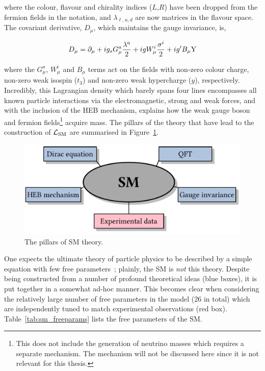\noindent
where the colour, flavour and chirality indices ($L$,$R$) have been dropped from the fermion fields in the notation, and $\lambda_{\ell,u,d}$ are now matrices in the flavour space. The covariant derivative, $D_\mu$, which maintains the gauge invariance, is,

\begin{equation}
    D_\mu = \partial_\mu + i g_s G^a_\mu \frac{\lambda^a}{2} + i g W^i_\mu \frac{\sigma^i}{2} + i g' B_\mu {\rm{Y}}
\end{equation}

\noindent
where the $G^a_\mu$, $W^i_\mu$ and $B_\mu$ terms act on the fields with non-zero colour charge, non-zero weak isospin ($t_3$) and non-zero weak hypercharge ($y$), respectively. Incredibly, this Lagrangian density which barely spans four lines encompasses all known particle interactions via the electromagnetic, strong and weak forces, and with the inclusion of the HEB mechanism, explains how the weak gauge boson and fermion fields\footnote{This does not include the generation of neutrino masses which requires a separate mechanism. The mechanism will not be discussed here since it is not relevant for this thesis.} acquire mass. The pillars of the theory that have lead to the construction of $\mathcal{L}_{\rm{SM}}$ are summarised in Figure~\ref{fig:sm_pillars}.

\begin{figure}[htb!]
  \centering
  \includegraphics[width=.7\linewidth]{Figures/theory/pillars_of_sm.pdf}
  \caption[The pillars of SM theory]
  {
    The pillars of SM theory.
  }
  \label{fig:sm_pillars}
\end{figure}

One expects the ultimate theory of particle physics to be described by a simple equation with few free parameters~\cite{Thomson:2013zua}; plainly, the SM is \textit{not} this theory. Despite being constructed from a number of profound theoretical ideas (blue boxes), it is put together in a somewhat ad-hoc manner. This becomes clear when considering the relatively large number of free parameters in the model (26 in total) which are independently tuned to match experimental observations (red box). Table~\ref{tab:sm_freeparams} lists the free parameters of the SM.


